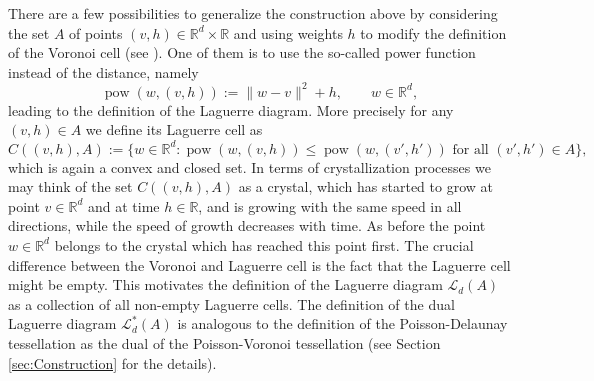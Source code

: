 \documentclass[11pt,a4paper]{article}
\theoremstyle{plain}
\theoremstyle{definition}
\theoremstyle{remark}
\def\RR{\mathbb{R}}
\def\cL{\mathcal{L}}
\newcommand{\pow}{\mathop{\mathrm{pow}}\nolimits}
\begin{document}
There are a few possibilities to generalize the construction above by considering the set $A$ of points $(v,h)\in \RR^d\times \RR$ and using weights $h$ to modify the definition of the Voronoi cell (see \cite[Section 3.1]{OBKC}). One of them is to use the so-called power function instead of the distance, namely
\[
    \pow\left(w,(v,h)\right) := \|w-v\|^2 + h,\qquad w\in\RR^d,
\]
leading to the definition of the Laguerre diagram. More precisely for any $(v,h)\in A$ we define its Laguerre cell as 
\[
    C((v,h), A) := \big\{w \in \RR^d: \pow(w,(v,h)) \le \pow(w,(v',h')) \text{ for all } (v',h') \in A\big\}, 
\]
which is again a convex and closed set. In terms of crystallization processes we may think of the set $C((v,h), A)$ as a crystal, which has started to grow at point $v\in\RR^d$ and at time $h\in\RR$, and is growing with the same speed in all directions, while the speed of growth decreases with time. As before the point $w\in\RR^d$ belongs to the crystal which has reached this point first. The crucial difference between the Voronoi and Laguerre cell is the fact that the Laguerre cell might be empty. This motivates the definition of the Laguerre diagram $\cL_d(A)$ as a collection of all non-empty Laguerre cells. The definition of the dual Laguerre diagram $\cL^*_d(A)$ is analogous to the definition of the Poisson-Delaunay tessellation as the dual of the Poisson-Voronoi tessellation (see Section \ref{sec:Construction} for the details).
\end{document}
